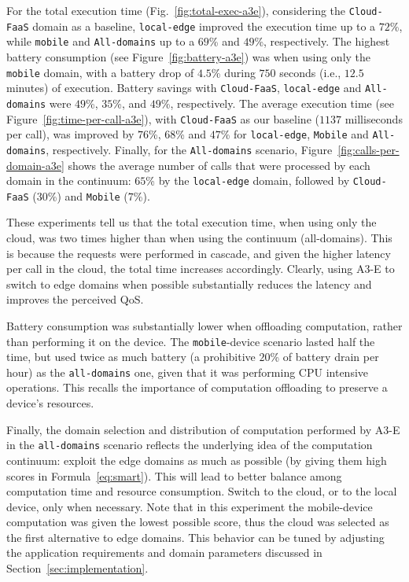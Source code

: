 For the total execution time (Fig.~\ref{fig:total-exec-a3e}), considering the \texttt{Cloud-FaaS} domain as a baseline, \texttt{local-edge} improved the execution time up to a $72$\%, while \texttt{mobile} and \texttt{All-domains} up to a $69$\% and $49$\%, respectively. The highest battery consumption (see Figure~\ref{fig:battery-a3e}) was when using only the \texttt{mobile} domain, with a battery drop of $4.5$\% during $750$ seconds (i.e., $12.5$ minutes) of execution. Battery savings with \texttt{Cloud-FaaS}, \texttt{local-edge} and \texttt{All-domains} were $49$\%, $35$\%, and $49$\%, respectively. The average execution time (see Figure~\ref{fig:time-per-call-a3e}), with \texttt{Cloud-FaaS} as our baseline ($1137$ milliseconds per call), was improved by $76$\%, $68$\% and $47$\% for \texttt{local-edge}, \texttt{Mobile} and \texttt{All-domains}, respectively. Finally, for the \texttt{All-domains} scenario, Figure~\ref{fig:calls-per-domain-a3e} shows the average number of calls that were processed by each domain in the continuum: $65$\% by the \texttt{local-edge} domain, followed by \texttt{Cloud-FaaS} ($30$\%) and \texttt{Mobile} ($7$\%).
 
These experiments tell us that the total execution time, when using only the cloud, was two times higher than when using the continuum (all-domains). This is because the requests were performed in cascade, and given the higher latency per call in the cloud, the total time increases accordingly. Clearly, using A3-E to switch to edge domains when possible substantially reduces the latency and improves the perceived QoS.

Battery consumption was substantially lower when offloading computation, rather than performing it on the device. The \texttt{mobile}-device scenario lasted half the time, but used twice as much battery (a prohibitive $20$\% of battery drain per hour) as the \texttt{all-domains} one, given that it was performing CPU intensive operations. This recalls the importance of computation offloading to preserve a device's resources.

Finally, the domain selection and distribution of computation performed by A3-E in the \texttt{all-domains} scenario reflects the underlying idea of the computation continuum: exploit the edge domains as much as possible (by giving them high scores in Formula~\ref{eq:smart}). This will lead to better balance among computation time and resource consumption. Switch to the cloud, or to the local device, only when necessary. Note that in this experiment the mobile-device computation was given the lowest possible score, thus the cloud was selected as the first alternative to edge domains. This behavior can be tuned by adjusting the application requirements and domain parameters discussed in Section~\ref{sec:implementation}.

